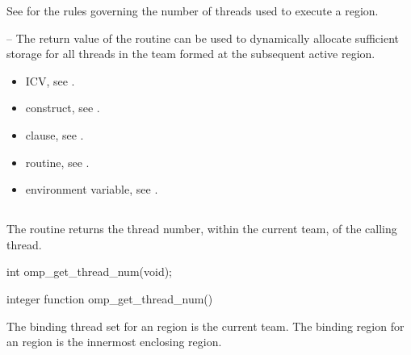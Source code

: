 See  
for the rules governing the number of threads used to 
execute a\linebreak {} region. 

\notestart
\noteheader – The return value of the  routine can be used to 
dynamically allocate sufficient storage for all threads in the team formed at the 
subsequent active  region.
\noteend

\crossreferences
\begin{itemize}
\item {} ICV, see 
.

\item {} construct, see 
.

\item {} clause, see 
.

\item {} routine, see 
.

\item {} environment variable, see 
.
\end{itemize}










\subsection{}
\label{subsec:omp_get_thread_num}
\summary
The  routine returns the thread number, within the current 
team, of the calling thread.

\format
\ccppspecificstart
\begin{boxedcode}
int omp\_get\_thread\_num(void); 
\end{boxedcode}
\ccppspecificend

\fortranspecificstart
\begin{boxedcode}
integer function omp\_get\_thread\_num() 
\end{boxedcode}
\fortranspecificend

\binding
The binding thread set for an  region is the current team. The 
binding region for an  region is the innermost enclosing 
 region. 

